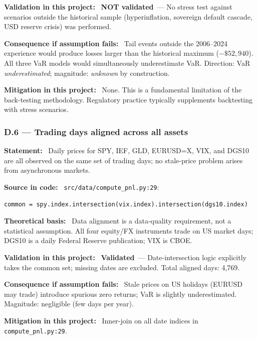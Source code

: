 \documentclass[11pt,a4paper]{article}
\newcommand{\asmfield}[1]{\medskip\noindent\textbf{#1:}\ }
\newcommand{\code}[1]{\texttt{#1}}
\newcommand{\validated}{\textbf{Validated}}
\newcommand{\notvalidated}{\textbf{NOT validated}}
\begin{document}
\asmfield{Validation in this project}
\notvalidated\ --- No stress test against scenarios outside the historical
sample (hyperinflation, sovereign default cascade, USD reserve crisis)
was performed.

\asmfield{Consequence if assumption fails}
Tail events outside the 2006--2024 experience would produce losses larger
than the historical maximum ($-\$52{,}940$). All three VaR models would
simultaneously underestimate VaR. Direction: VaR \emph{underestimated};
magnitude: \emph{unknown} by construction.

\asmfield{Mitigation in this project}
None. This is a fundamental limitation of the back-testing methodology.
Regulatory practice typically supplements backtesting with stress scenarios.

\subsubsection{D.6 --- Trading days aligned across all assets}\label{asm:D6}

\asmfield{Statement}
Daily prices for SPY, IEF, GLD, EURUSD=X, VIX, and DGS10 are all
observed on the same set of trading days; no stale-price problem arises
from asynchronous markets.

\asmfield{Source in code}
\code{src/data/compute\_pnl.py:29}:
\begin{lstlisting}
common = spy.index.intersection(vix.index).intersection(dgs10.index)
\end{lstlisting}

\asmfield{Theoretical basis}
Data alignment is a data-quality requirement, not a statistical assumption.
All four equity/FX instruments trade on US market days; DGS10 is a daily
Federal Reserve publication; VIX is CBOE.

\asmfield{Validation in this project}
\validated\ --- Date-intersection logic explicitly takes the common set;
missing dates are excluded. Total aligned days: 4{,}769.

\asmfield{Consequence if assumption fails}
Stale prices on US holidays (EURUSD may trade) introduce spurious zero
returns; VaR is slightly underestimated. Magnitude: negligible (few days
per year).

\asmfield{Mitigation in this project}
Inner-join on all date indices in \code{compute\_pnl.py:29}.

\end{document}
